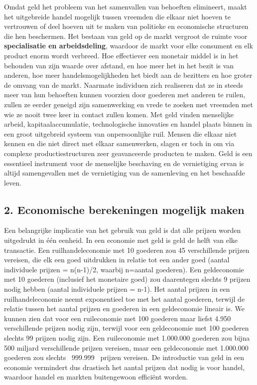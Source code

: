 Omdat geld het probleem van het samenvallen van behoeften elimineert, maakt het uitgebreide handel mogelijk tussen vreemden die elkaar niet hoeven te vertrouwen of deel hoeven uit te maken van politieke en economische structuren die hen beschermen. Het bestaan van geld op de markt vergroot de ruimte voor \textbf{specialisatie en arbeidsdeling}, waardoor de markt voor elke consument en elk product enorm wordt verbreed. Hoe effectiever een monetair middel is in het behouden van zijn waarde over afstand, en hoe meer het in het bezit is van anderen, hoe meer handelsmogelijkheden het biedt aan de bezitters en hoe groter de omvang van de markt. Naarmate individuen zich realiseren dat ze in steeds meer van hun behoeften kunnen voorzien door goederen met anderen te ruilen, zullen ze eerder geneigd zijn samenwerking en vrede te zoeken met vreemden met wie ze nooit twee keer in contact zullen komen. Met geld vinden menselijke arbeid, kapitaalaccumulatie, technologische innovaties en handel plaats binnen in een groot uitgebreid systeem van onpersoonlijke ruil. Mensen die elkaar niet kennen en die niet direct met elkaar samenwerken, slagen er toch in om via complexe productiestructuren zeer geavanceerde producten te maken. Geld is een essentieel instrument voor de menselijke beschaving en de vernietiging ervan is altijd samengevallen met de vernietiging van de samenleving en het beschaafde leven.

\subsection{2. Economische berekeningen mogelijk maken}

Een belangrijke implicatie van het gebruik van geld is dat alle prijzen worden uitgedrukt in één eenheid. In een economie met geld is geld de helft van elke transactie. Een ruilhandeleconomie met 10 goederen zou 45 verschillende prijzen vereisen, die elk een goed uitdrukken in relatie tot een ander goed (aantal individuele prijzen = n(n-1)/2, waarbij n=aantal goederen). Een geldeconomie met 10 goederen (inclusief het monetaire goed) zou daarentegen slechts 9 prijzen nodig hebben (aantal individuele prijzen = n-1). Het aantal prijzen in een ruilhandeleconomie neemt exponentieel toe met het aantal goederen, terwijl de relatie tussen het aantal prijzen en goederen in een geldeconomie lineair is. We kunnen zien dat voor een ruileconomie met 100 goederen maar liefst 4.950 verschillende prijzen nodig zijn, terwijl voor een geldeconomie met 100 goederen slechts 99 prijzen nodig zijn. Een ruileconomie met 1.000.000 goederen zou bijna 500 miljard verschillende prijzen vereisen, maar een geldeconomie met 1.000.000 goederen zou slechts ~999.999~ prijzen vereisen. De introductie van geld in een economie vermindert dus drastisch het aantal prijzen dat nodig is voor handel, waardoor handel en markten buitengewoon efficiënt worden.

